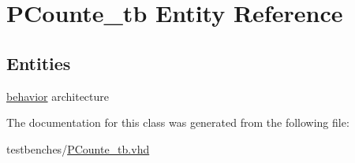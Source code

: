 \hypertarget{class_p_counte__tb}{\section{\-P\-Counte\-\_\-tb \-Entity \-Reference}
\label{class_p_counte__tb}
}
\subsection*{\-Entities}
\begin{DoxyCompactItemize}
\item 
\hyperlink{class_p_counte__tb_1_1behavior}{behavior} architecture
\end{DoxyCompactItemize}


\-The documentation for this class was generated from the following file\-:\begin{DoxyCompactItemize}
\item 
testbenches/\hyperlink{_p_counte__tb_8vhd}{\-P\-Counte\-\_\-tb.\-vhd}\end{DoxyCompactItemize}

